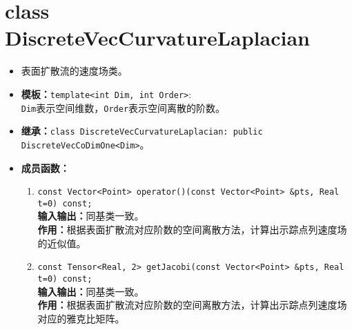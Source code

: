 \documentclass[a4paper,twoside]{ctexart}
\begin{document}
\section{class DiscreteVecCurvatureLaplacian}
\begin{itemize}
    \item 表面扩散流的速度场类。
    \item \textbf{模板：}\texttt{template<int Dim, int Order>}:\\
    \texttt{Dim}表示空间维数，\texttt{Order}表示空间离散的阶数。
    \item \textbf{继承：}\texttt{class DiscreteVecCurvatureLaplacian: public DiscreteVecCoDimOne<Dim>}。
    \item \textbf{成员函数：}
        \begin{enumerate}[(1)]
            \item \texttt{const Vector<Point> operator()(const Vector<Point> \&pts, Real t=0) const;}\\
            \textbf{输入输出：}同基类一致。\\
            \textbf{作用：}根据表面扩散流对应阶数的空间离散方法，计算出示踪点列速度场的近似值。
            \item \texttt{const Tensor<Real, 2> getJacobi(const Vector<Point> \&pts, Real t=0) const;}\\
            \textbf{输入输出：}同基类一致。\\
            \textbf{作用：}根据表面扩散流对应阶数的空间离散方法，计算出示踪点列速度场对应的雅克比矩阵。
        \end{enumerate}
\end{itemize}
\end{document}
